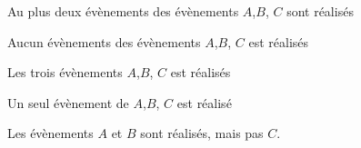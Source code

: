\documentclass{beamer}
\begin{document}
\begin{frame}[t]
   {

           \scriptsize
            Au plus deux évènements des évènements $A$,$B$, $C$ sont  réalisés

   }

   {

           \scriptsize
            Aucun évènements des évènements $A$,$B$, $C$ est  réalisés

   }

   {

           \scriptsize
            Les trois  évènements $A$,$B$, $C$ est  réalisés

   }

   {

           \scriptsize
            Un seul évènement de $A$,$B$, $C$ est  réalisé

   }

   {

           \scriptsize
           Les évènements $A$ et $B$ sont réalisés, mais pas $C$.

   }
\end{frame}
\end{document}
